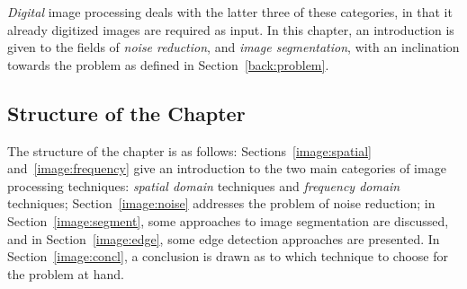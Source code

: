 {\em Digital\/} image processing deals with the latter three of these
categories, in that it already digitized images are required as input.
In this chapter, an introduction is given to the fields of {\em noise
  reduction\/}, and {\em image segmentation\/}, with an inclination
towards the problem as defined in Section~\ref{back:problem}.

\subsection{Structure of the Chapter}
\label{image:intro:structure}

The structure of the chapter is as follows:
Sections~\ref{image:spatial} and~\ref{image:frequency} give an
introduction to the two main categories of image processing
techniques: {\em spatial domain\/} techniques and {\em frequency
  domain\/} techniques; Section~\ref{image:noise} addresses the
problem of noise reduction; in Section~\ref{image:segment}, some
approaches to image segmentation are discussed, and in
Section~\ref{image:edge}, some edge detection approaches are
presented.  In Section~\ref{image:concl}, a conclusion is drawn as to
which technique to choose for the problem at hand.

